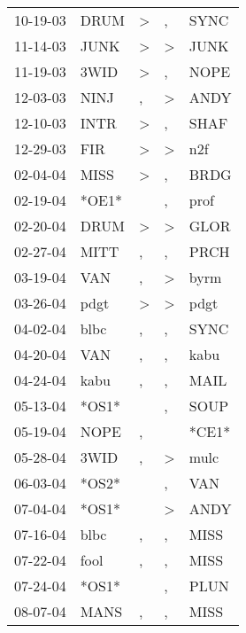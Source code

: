 \begin{supertabular}{lllll}
 10-19-03 &   DRUM &     \textgreater &                , &   SYNC \\
 11-14-03 &   JUNK &     \textgreater &     \textgreater &   JUNK \\
 11-19-03 &   3WID &     \textgreater &                , &   NOPE \\
 12-03-03 &   NINJ &                , &     \textgreater &   ANDY \\
 12-10-03 &   INTR &     \textgreater &                , &   SHAF \\
 12-29-03 &    FIR &     \textgreater &     \textgreater &    n2f \\
 02-04-04 &   MISS &     \textgreater &                , &   BRDG \\
 02-19-04 &  *OE1* &                  &                , &   prof \\
 02-20-04 &   DRUM &     \textgreater &     \textgreater &   GLOR \\
 02-27-04 &   MITT &                , &                , &   PRCH \\
 03-19-04 &    VAN &                , &     \textgreater &   byrm \\
 03-26-04 &   pdgt &     \textgreater &     \textgreater &   pdgt \\
 04-02-04 &   blbc &                , &                , &   SYNC \\
 04-20-04 &    VAN &                , &                , &   kabu \\
 04-24-04 &   kabu &                , &                , &   MAIL \\
 05-13-04 &  *OS1* &                  &                , &   SOUP \\
 05-19-04 &   NOPE &                , &                  &  *CE1* \\
 05-28-04 &   3WID &                , &     \textgreater &   mulc \\
 06-03-04 &  *OS2* &                  &                , &    VAN \\
 07-04-04 &  *OS1* &                  &     \textgreater &   ANDY \\
 07-16-04 &   blbc &                , &                , &   MISS \\
 07-22-04 &   fool &                , &                , &   MISS \\
 07-24-04 &  *OS1* &                  &                , &   PLUN \\
 08-07-04 &   MANS &                , &                , &   MISS \\

\end{supertabular}
